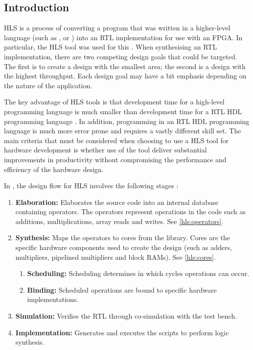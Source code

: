 \subsection{Introduction}
\label{hls:introduction}
\nocite{Xilinx:Tutorial}
\gls{HLS} is a process of converting a program that was written in a
higher-level language (such as ,  or
) into an \gls{RTL} implementation for use with an \gls{FPGA}.
In particular, the \gls{HLS} tool  was used for this
\thesis{}. When synthesising an \gls{RTL} implementation, there are two
competing design goals that could be targeted. The first is to create a design
with the smallest area; the second is a design with the highest throughput. Each
design goal may have a bit emphasis depending on the nature of the application.

The key advantage of \gls{HLS} tools is that development time for a high-level
programming language is much smaller than development time for a \gls{RTL}
\gls{HDL} programming language \cite{Berkeley:2010}. In addition, programming in
an \gls{RTL} \gls{HDL} programming language is much more error prone and
requires a vastly different skill set. The main criteria that must be considered
when choosing to use a \gls{HLS} tool for hardware development is whether use of
the tool deliver substantial improvements in productivity without compromising
the performance and efficiency of the hardware design.

In , the design flow for \gls{HLS} involves the following
stages \cite{Xilinx:Tutorial}:
\begin{enumerate}
    \item \textbf{Elaboration:} Elaborates the source code into an internal
        database containing operators. The operators represent operations in the
         code such as additions, multiplications, array reads and
        writes. See \autoref{hls:operators}.
    \item \textbf{Synthesis:} Maps the operators to cores from the
         library. Cores are the specific hardware components
        used to create the design (such as adders, multipliers, pipelined
        multipliers and block \glspl{RAM}). See \autoref{hls:cores}.
    \begin{enumerate}
        \item \textbf{Scheduling:} Scheduling determines in which cycles
            operations can occur.
        \item \textbf{Binding:} Scheduled operations are bound to specific
            hardware implementations.
    \end{enumerate}
    \item \textbf{Simulation:} Verifies the \gls{RTL} through co-simulation with
        the  test bench.
    \item \textbf{Implementation:} Generates and executes the scripts to perform
        logic synthesis.
\end{enumerate}


